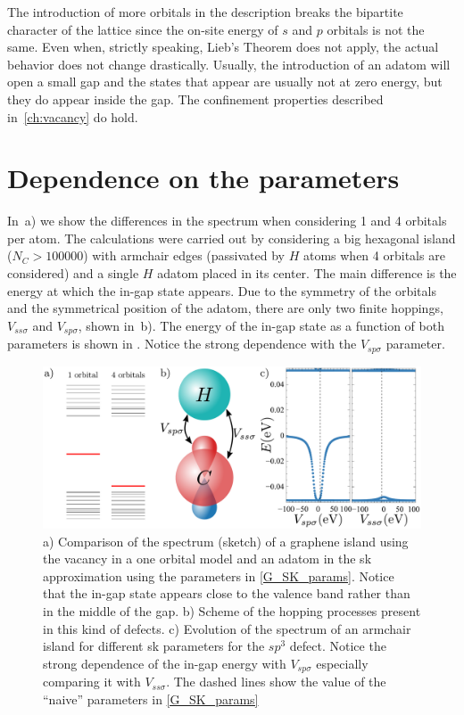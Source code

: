 The introduction of more orbitals in the description breaks the bipartite character of the lattice since the on-site energy of $s$ and $p$ orbitals is not the same. Even when, strictly speaking, Lieb's Theorem does not apply, the actual behavior does not change drastically.
Usually, the introduction of an adatom will open a small gap and the states that appear are usually not at zero energy, but they do appear inside the gap. The confinement properties described in~\ref{ch:vacancy} do hold.


\section{Dependence on the parameters}
In~a) we show the differences in the spectrum when considering 1 and 4 orbitals per atom. The calculations were carried out by considering a big hexagonal island ($N_C>100000$) with armchair edges (passivated by $H$ atoms when 4 orbitals are considered) and a single $H$ adatom placed in its center.
The main difference is the energy at which the in-gap state appears.
Due to the symmetry of the orbitals and the symmetrical position of the adatom, there are only two finite hoppings, $V_{ss\sigma}$ and $V_{sp\sigma}$, shown in~b).
The energy of the in-gap state as a function of both parameters is shown in . Notice the strong dependence with the $V_{sp\sigma}$ parameter.

\begin{figure}[h!]
  \centering
  \includegraphics{defects/fig/Vsss_Vsps.pdf}
  \vspace{-5pt}
  \caption{a) Comparison of the spectrum (sketch) of a graphene island using the vacancy in a one orbital model and an adatom in the \ac{sk} approximation using the parameters in \ref{G_SK_params}. Notice that the in-gap state appears close to the valence band rather than in the middle of the gap. b) Scheme of the hopping processes present in this kind of defects. c) Evolution of the spectrum of an armchair island for different \ac{sk} parameters for the $sp^3$ defect. Notice the strong dependence of the in-gap energy with $V_{sp\sigma}$ especially comparing it with $V_{ss\sigma}$. The dashed lines show the value of the ``naive'' parameters in \ref{G_SK_params}}
\label{ingap}
\end{figure}

